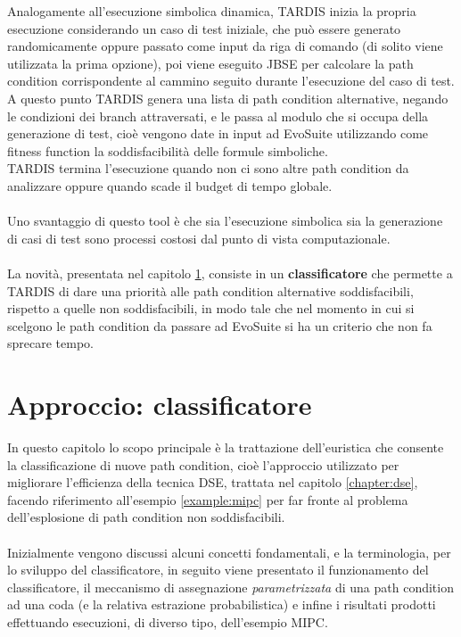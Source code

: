 \documentclass[a4paper, 12pt, oneside]{book}
\theoremstyle{normal}
\begin{document}
\noindent Analogamente all'esecuzione simbolica dinamica, TARDIS inizia la propria esecuzione considerando un caso di test iniziale, che può essere generato randomicamente oppure passato come input da riga di comando (di solito viene utilizzata la prima opzione), poi viene eseguito JBSE per calcolare la path condition corrispondente al cammino seguito durante l'esecuzione del caso di test. \\ A questo punto TARDIS genera una lista di path condition alternative, negando le condizioni dei branch attraversati, e le passa al modulo che si occupa della generazione di test, cioè vengono date in input ad EvoSuite utilizzando come fitness function la soddisfacibilità delle formule simboliche. \\ TARDIS termina l'esecuzione quando non ci sono altre path condition da analizzare oppure quando scade il budget di tempo globale. \\ \\ Uno svantaggio di questo tool è che sia l'esecuzione simbolica sia la generazione di casi di test sono processi costosi dal punto di vista computazionale.
\\ \\ La novità, presentata nel capitolo \ref{chapter:classifier}, consiste in un \textbf{classificatore} che permette a TARDIS di dare una priorità alle path condition alternative soddisfacibili, rispetto a quelle non soddisfacibili, in modo tale che nel momento in cui si scelgono le path condition da passare ad EvoSuite si ha un criterio che non fa sprecare tempo.


\chapter{Approccio: classificatore}\label{chapter:classifier}

In questo capitolo lo scopo principale è la trattazione dell'euristica che consente la classificazione di nuove path condition, cioè l'approccio utilizzato per migliorare l'efficienza della tecnica DSE, trattata nel capitolo \ref{chapter:dse}, facendo riferimento all'esempio \ref{example:mipc} per far fronte al problema dell'esplosione di path condition non soddisfacibili. \\ \\ Inizialmente vengono discussi alcuni concetti fondamentali, e la terminologia, per lo sviluppo del classificatore, in seguito viene presentato il funzionamento del classificatore, il meccanismo di assegnazione \emph{parametrizzata} di una path condition ad una coda (e la relativa estrazione probabilistica) e infine i risultati prodotti effettuando esecuzioni, di diverso tipo, dell'esempio MIPC.
\end{document}
